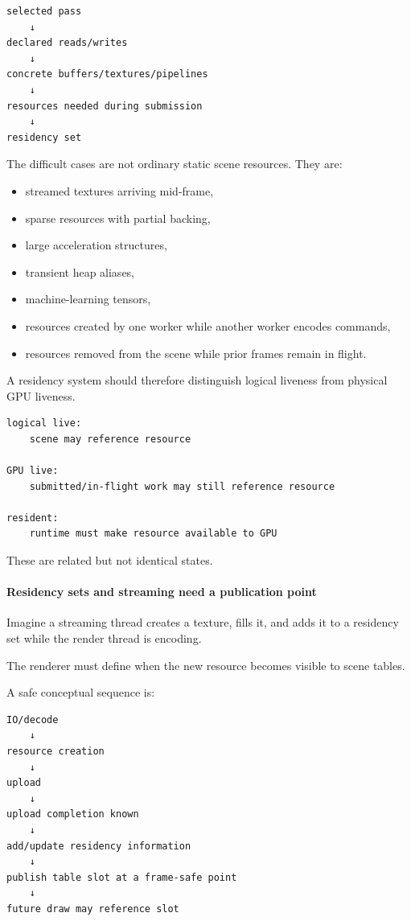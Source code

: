 \begin{verbatim}
selected pass
    ↓
declared reads/writes
    ↓
concrete buffers/textures/pipelines
    ↓
resources needed during submission
    ↓
residency set
\end{verbatim}

The difficult cases are not ordinary static scene resources. They are:

\begin{itemize}
\tightlist
\item
  streamed textures arriving mid-frame,
\item
  sparse resources with partial backing,
\item
  large acceleration structures,
\item
  transient heap aliases,
\item
  machine-learning tensors,
\item
  resources created by one worker while another worker encodes commands,
\item
  resources removed from the scene while prior frames remain in flight.
\end{itemize}

A residency system should therefore distinguish logical liveness from physical GPU liveness.

\begin{verbatim}
logical live:
    scene may reference resource

GPU live:
    submitted/in-flight work may still reference resource

resident:
    runtime must make resource available to GPU
\end{verbatim}

These are related but not identical states.

\paragraph{Residency sets and streaming need a publication point}\label{residency-sets-and-streaming-need-a-publication-point}

Imagine a streaming thread creates a texture, fills it, and adds it to a residency set while the render thread is encoding.

The renderer must define when the new resource becomes visible to scene tables.

A safe conceptual sequence is:

\begin{verbatim}
IO/decode
    ↓
resource creation
    ↓
upload
    ↓
upload completion known
    ↓
add/update residency information
    ↓
publish table slot at a frame-safe point
    ↓
future draw may reference slot
\end{verbatim}

